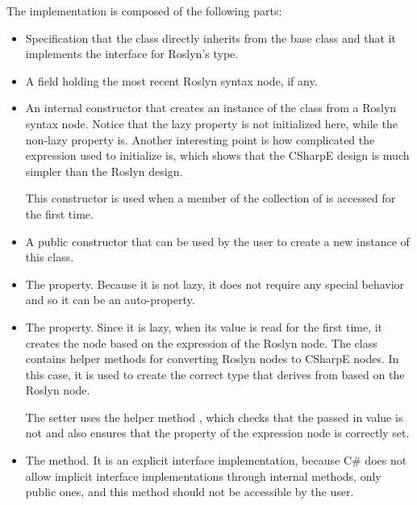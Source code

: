 The implementation is composed of the following parts:

\begin{itemize}
\item Specification that the class directly inherits from the  base class and that it implements the  interface for Roslyn's  type.

\item A field holding the most recent Roslyn syntax node, if any.

\item An internal constructor that creates an instance of the class from a Roslyn syntax node. Notice that the lazy property  is not initialized here, while the non-lazy property  is. Another interesting point is how complicated the expression used to initialize  is, which shows that the CSharpE design is much simpler than the Roslyn design.

This constructor is used when a member of the  collection of  is accessed for the first time.

\item A public constructor that can be used by the user to create a new instance of this class.

\item The  property. Because it is not lazy, it does not require any special behavior and so it can be an auto-property.

\item The  property. Since it is lazy, when its value is read for the first time, it creates the  node based on the expression of the Roslyn node. The  class contains helper methods for converting Roslyn nodes to CSharpE nodes. In this case, it is used to create the correct type that derives from  based on the Roslyn node.

The setter uses the helper method , which checks that the passed in value is not  and also ensures that the  property of the expression node is correctly set.

\item The  method. It is an explicit interface implementation, because C\# does not allow implicit interface implementations through internal methods, only public ones, and this method should not be accessible by the user.


\end{itemize}
